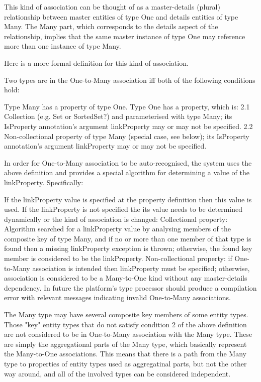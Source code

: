   This kind of association can be thought of as a master-details (plural) relationship between master entities of type One and details entities of type Many. The Many part, which corresponds to the details aspect of the relationship, implies that the same master instance of type One may reference more than one instance of type Many.

  Here is a more formal definition for this kind of association.

  Two types are in the One-to-Many association iff both of the following conditions hold:

  Type Many has a property of type One.
  Type One has a property, which is:
    2.1 Collection (e.g. Set or SortedSet?) and parameterised with type Many; its IsProperty annotation's argument linkProperty may or may not be specified.
    2.2 Non-collectional property of type Many (special case, see below); its IsProperty annotation's argument linkProperty may or may not be specified.

  In order for One-to-Many association to be auto-recognised, the system uses the above definition and provides a special algorithm for determining a value of the linkProperty. Specifically:

  If the linkProperty value is specified at the property definition then this value is used.
  If the linkProperty is not specified the its value needs to be determined dynamically or the kind of association is changed:
  Collectional property: Algorithm searched for a linkProperty value by analysing members of the composite key of type Many, and if no or more than one member of that type is found then a missing linkProperty exception is thrown; otherwise, the found key member is considered to be the linkProperty.
  Non-collectional property: if One-to-Many association is intended then linkProperty must be specified; otherwise, association is considered to be a Many-to-One kind without any master-details dependency.
  In future the platform's type processor should produce a compilation error with relevant messages indicating invalid One-to-Many associations.

  The Many type may have several composite key members of some entity types. Those "key" entity types that do not satisfy condition 2 of the above definition are not considered to be in One-to-Many association with the Many type. These are simply the aggregational parts of the Many type, which basically represent the Many-to-One associations. This means that there is a path from the Many type to properties of entity types used as aggregatinal parts, but not the other way around, and all of the involved types can be considered independent.

